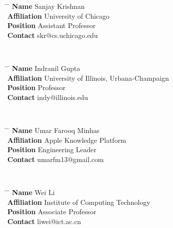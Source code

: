 \documentclass[10pt]{article} %
\begin{document}
\parbox{0.5\textwidth}{ %
\begin{tabbing}
\hspace{2cm} \= \hspace{4cm} \= \kill %
{\bf Name} \> Sanjay Krishnan \\ %
{\bf Affiliation} \> University of Chicago \\ %
{\bf Position} \> Assistant Professor \\ %
{\bf Contact} \> skr@cs.uchicago.edu %
\end{tabbing}}
\\
\parbox{0.5\textwidth}{ %
\begin{tabbing}
\hspace{2cm} \= \hspace{4cm} \= \kill %
{\bf Name} \> Indranil Gupta \\ %
{\bf Affiliation} \> University of Illinois, Urbana-Champaign \\ %
{\bf Position} \> Professor \\ %
{\bf Contact} \> indy@illinois.edu %
\end{tabbing}}
\\
\parbox{0.5\textwidth}{ %
\begin{tabbing}
\hspace{2cm} \= \hspace{4cm} \= \kill %
{\bf Name} \> Umar Farooq Minhas \\ %
{\bf Affiliation} \> Apple Knowledge Platform \\ %
{\bf Position} \> Engineering Leader \\ %
{\bf Contact} \> umarfm13@gmail.com %
\end{tabbing}}
\\
\parbox{0.5\textwidth}{ %
\begin{tabbing}
\hspace{2cm} \= \hspace{4cm} \= \kill %
{\bf Name} \> Wei Li\\ %
{\bf Affiliation} \> Institute of Computing Technology \\ %
{\bf Position} \> Associate Professor \\ %
{\bf Contact} \> liwei@ict.ac.cn %
\end{tabbing}}
\hfill


\end{document}
